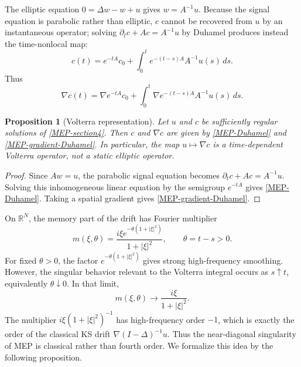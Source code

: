 \documentclass[pdflatex,sn-mathphys-num]{sn-jnl}%
\theoremstyle{thmstyleone}
\newtheorem{proposition}[theorem]{Proposition}%
\theoremstyle{thmstyletwo}
\theoremstyle{thmstylethree}
\begin{document}
The elliptic equation \(0=\Delta w-w+u\) gives \(w=A^{-1}u\). 
Because the signal equation is parabolic rather than elliptic, $c$ cannot be recovered from $u$ by an instantaneous operator; solving $\partial_t c + Ac = A^{-1}u$ by Duhamel produces instead the time-nonlocal map:
\begin{equation}
        c(t)=e^{-tA}c_0+\int_0^t e^{-(t-s)A}A^{-1}u(s)\,ds.
\label{MEP-Duhamel}
\end{equation}
Thus
\begin{equation}
        \nabla c(t)
        =
        \nabla e^{-tA}c_0
        +
        \int_0^t\nabla e^{-(t-s)A}A^{-1}u(s)\,ds.
\label{MEP-gradient-Duhamel}
\end{equation}

\begin{proposition}[Volterra representation]
\label{prop:MEP-volterra-representation}
Let \(u\) and \(c\) be sufficiently regular solutions of \eqref{MEP-section4}.
Then \(c\) and \(\nabla c\) are given by \eqref{MEP-Duhamel} and
\eqref{MEP-gradient-Duhamel}.  In particular, the map \(u\mapsto\nabla c\) is
a time-dependent Volterra operator, not a static elliptic operator.
\end{proposition}

\begin{proof}
Since \(Aw=u\), the parabolic signal equation becomes
\(\partial_tc+Ac=A^{-1}u\).  Solving this inhomogeneous linear equation by the
semigroup \(e^{-tA}\) gives \eqref{MEP-Duhamel}.  Taking a spatial gradient
gives \eqref{MEP-gradient-Duhamel}.
\end{proof}

On \(\mathbb R^N\), the memory part of the drift has Fourier multiplier
\begin{equation}
        m(\xi,\theta)
        =
        \frac{i\xi e^{-\theta(1+|\xi|^2)}}{1+|\xi|^2},
        \qquad \theta=t-s>0.
\label{MEP-multiplier-section4}
\end{equation}
For fixed \(\theta>0\), the factor \(e^{-\theta(1+|\xi|^2)}\) gives strong
high-frequency smoothing.  However, the singular behavior relevant to the
Volterra integral occurs as \(s\uparrow t\), equivalently
\(\theta\downarrow0\).  In that limit,
\begin{equation}
        m(\xi,\theta)\longrightarrow \frac{i\xi}{1+|\xi|^2}.
\label{MEP-near-diagonal}
\end{equation}
The multiplier \(i\xi(1+|\xi|^2)^{-1}\) has high-frequency order \(-1\), which
is exactly the order of the classical KS drift
\(\nabla(I-\Delta)^{-1}u\). Thus the near-diagonal singularity of MEP is
classical rather than fourth order. We formalize this idea by the following proposition.
\end{document}

